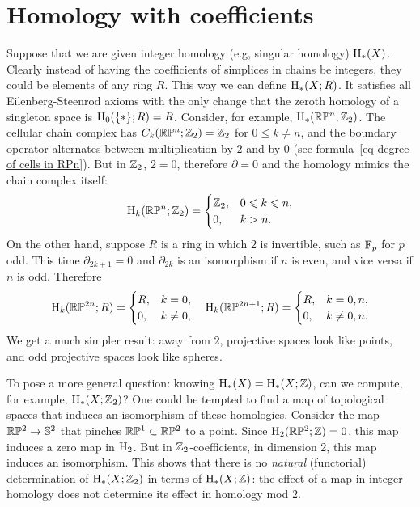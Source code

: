 




\section{Homology with coefficients}

Suppose that we are given integer homology (e.g, singular homology) $\mathrm{H}_\ast(X)$. Clearly instead of having the coefficients of simplices in chains be integers, they could be elements of any ring $R$. This way we can define $\mathrm{H}_\ast(X;R)$. It satisfies all Eilenberg-Steenrod axioms with the only change that the zeroth homology of a singleton space is $\mathrm{H}_0(\{\ast\};R)=R$. Consider, for example, $\mathrm{H}_\ast(\mathbb{R}\mathbb{P}^n;\mathbb{Z}_2)$. The cellular chain complex has $C_k(\mathbb{R}\mathbb{P}^n;\mathbb{Z}_2)=\mathbb{Z}_2$ for $0\leq k\neq n$, and the boundary operator alternates between multiplication by $2$ and by $0$ (see formula~\ref{eq degree of cells in RPn}). But in $\mathbb{Z}_2$, $2=0$, therefore $\partial=0$ and the homology mimics the chain complex itself:
\[\mathrm{H}_k(\mathbb{R}\mathbb{P}^n;\mathbb{Z}_2)=\begin{cases}
    \mathbb{Z}_2,& 0\leqslant k\leqslant n,\\
    0, & k>n.
\end{cases}\]
On the other hand, suppose $R$ is a ring in which $2$ is invertible, such as $\mathbb{F}_p$ for $p$ odd. This time $\partial_{2k+1}=0$ and $\partial_{2k}$ is an isomorphism if $n$ is even, and vice versa if $n$ is odd. Therefore 
\[\mathrm{H}_k(\mathbb{R}\mathbb{P}^{2n};R)=\begin{cases}
    R,&k=0,\\
    0,&k\neq 0,
\end{cases}\quad
\mathrm{H}_k(\mathbb{R}\mathbb{P}^{2n+1};R)=\begin{cases}
    R,&k=0,n,\\
    0,&k\neq 0,n.
\end{cases}
\]
We get a much simpler result: away from $2$, projective spaces look like points, and odd projective spaces look like spheres.

To pose a more general question: knowing $\mathrm{H}_\ast(X)=\mathrm{H}_\ast(X;\mathbb{Z})$, can we compute, for example, $\mathrm{H}_\ast(X;\mathbb{Z}_2)$? One could be tempted to find a map of topological spaces that induces an isomorphism of these homologies. Consider the map $\mathbb{R}\mathbb{P}^2\to \mathbb{S}^2$ that pinches $\mathbb{R}\mathbb{P}^1\subset \mathbb{R}\mathbb{P}^2$ to a point. Since $\mathrm{H}_2(\mathbb{R}\mathbb{P}^2;\mathbb{Z})=0$, this map induces a zero map in $\mathrm{H}_2$. But in $\mathbb{Z}_2$-coefficients, in dimension 2, this map induces an isomorphism. This shows that there is no \emph{natural} (functorial) determination of $\mathrm{H}_\ast(X;\mathbb{Z}_2)$ in terms of $\mathrm{H}_\ast(X;\mathbb{Z})$: the effect of a map in integer homology does not determine its effect in homology mod $2$. 

